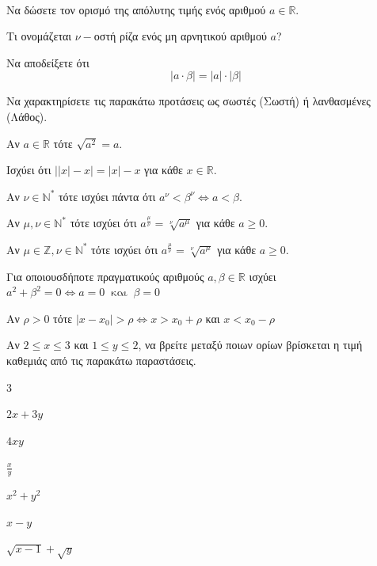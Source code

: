 \documentclass[11pt,a4paper]{article}
\begin{document}
\begin{thema}
\item\mbox{}\\\vspace{-7mm}
\begin{erwthma}
\item Να δώσετε τον ορισμό της απόλυτης τιμής ενός αριθμού $ a\in\mathbb{R} $.
\item Τι ονομάζεται $ \nu- $οστή ρίζα ενός μη αρνητικού αριθμού $ a $?
\item Να αποδείξετε ότι 
\[ |a\cdot \beta|=|a|\cdot|\beta| \]
\item Να χαρακτηρίσετε τις παρακάτω προτάσεις ως σωστές (Σωστή) ή λανθασμένες (Λάθος).
\begin{alist}
\item Αν $ a\in\mathbb{R} $ τότε $ \sqrt{a^2}=a $.
\item Ισχύει ότι $ \big||x|-x\big|=|x|-x $ για κάθε $ x\in\mathbb{R} $.
\item Αν $ \nu\in\mathbb{N}^* $ τότε ισχύει πάντα ότι $ a^{\nu}<\beta^{\nu}\Leftrightarrow a<\beta $.
\item Αν $ \mu,\nu\in\mathbb{N}^* $ τότε ισχύει ότι $ a^{\frac{\mu}{\nu}}=\sqrt[\nu]{a^{\mu}} $ για κάθε $ a\geq 0 $.
\item Αν $ \mu\in\mathbb{Z},\nu\in\mathbb{N}^* $ τότε ισχύει ότι $ a^{\frac{\mu}{\nu}}=\sqrt[\nu]{a^{\mu}} $ για κάθε $ a\geq 0 $.
\item Για οποιουσδήποτε πραγματικούς αριθμούς $ a,\beta\in\mathbb{R} $ ισχύει $ a^2+\beta^2=0\Leftrightarrow a=0\ \text{ και }\ \beta=0 $
\item Αν $ \rho>0 $ τότε $ |x-x_0|>\rho\Leftrightarrow x>x_0+\rho $ και $ x<x_0-\rho $
\end{alist}
\end{erwthma}
\item Αν $ 2\leq x\leq 3 $ και $ 1\leq y\leq 2 $, να βρείτε μεταξύ ποιων ορίων βρίσκεται η τιμή καθεμιάς από τις παρακάτω παραστάσεις.
\begin{erwthma}
\begin{multicols}{3}
\item $ 2x+3y $
\item $ 4xy $
\item $ \frac{x}{y} $
\item $ x^2+y^2 $
\item $ x-y $
\item $ \sqrt{x-1}+\sqrt{y} $
\end{multicols}
\end{erwthma}

\end{thema}
\end{document}
